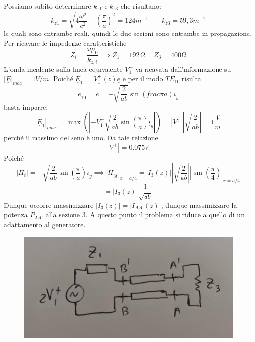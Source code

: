 \documentclass{book}
\begin{document}
    Possiamo subito determinare $k_{z1}$ e $k_{z3}$ che risultano:
    \begin{equation}
        k_{z1} = \sqrt{4 \frac{\omega ^{2}}{c ^{2}} - (\frac{\pi}{a})^{2}} = 124 m^{-1} \qquad k_{z3} = 59,3 m^{-1}
    \end{equation}
    le quali sono entrambe reali, quindi le due sezioni sono entrambe in propagazione. Per ricavare le impedenze caratteristiche
    \begin{equation}
        Z_{i} = \frac{\omega \mu_{0}}{k_{z,i}} \implies Z_{1} = 192 \Omega , \ \ \ \ Z_{3} = 400 \Omega
    \end{equation}
    L'onda incidente sulla linea equivalente $V_{1} ^{+}$ va ricavata dall'informazione su $|\underline{E}|_{max} = 1 V/m$. Poiché $\underline{E}_{1} ^{+} = V_{1} ^{+}(z)\underline{e}$
    e per il modo $TE_{10}$ risulta
    \begin{equation}
        \underline{e}_{10} = \underline{e} = -\sqrt{\frac{2}{ab}}\sin(frac{\pi}{a}) \underline{i}_{y}
    \end{equation}
    basta imporre:
    \begin{equation}
        |\underline{E}_{1}|_{max} = \max(|-V_{1} ^{+} \sqrt{\frac{2}{ab}}\sin(\frac{\pi}{a}) \underline{i}_{y}| ) = |V^{+}||\sqrt{\frac{2}{ab}}| = 1 \frac{V}{m}
    \end{equation}
    perché il massimo del seno è uno. Da tale relazione
    \begin{equation}
        |V^{+}| = 0.075V
    \end{equation}
    Poiché
    \begin{equation}
        |H_{t}| = -\sqrt{\frac{2}{ab}}\sin(\frac{\pi}{a}) \underline{i}_{y} \implies |\underline{H}_{3t}|_{x= a/4} = |I_{3} (z)| |\sqrt{\frac{2}{ab}}| |\sin(\frac{\pi}{4})|_{x = a/4} 
    \end{equation}
    \begin{equation}
        = |I_{3} (z)|\frac{1}{\sqrt{ab}}
    \end{equation}
    Dunque occorre massimizzare $|I_{3} (z)| = |I_{AA'} (z)|$, dunque massimizzare la potenza $P_{AA'}$ alla sezione $3$. A questo punto il problema si riduce a quello di un adattamento al generatore.
    \begin{figure}[h!]
        \center  
        \includegraphics[width=0.6\linewidth]{img/Esercizi/Esercizi7.png}
    \end{figure} \\
\end{document}
